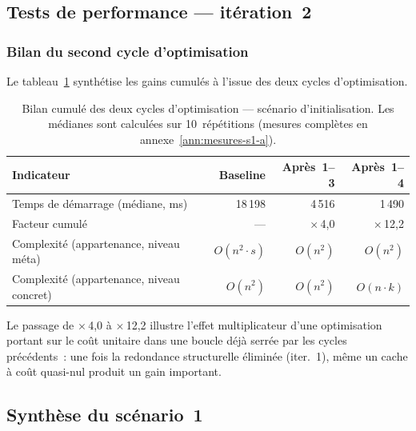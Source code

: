 \subsection{Tests de performance --- itération~2}
\label{sec:scenario1-tests2}

\subsubsection{Bilan du second cycle d'optimisation}

Le tableau~\ref{tab:bilan-opti2} synthétise les gains cumulés à l'issue
des deux cycles d'optimisation.

\begin{table}[h]
\centering
\caption{Bilan cumulé des deux cycles d'optimisation ---
scénario d'initialisation. Les médianes sont calculées sur 10~répétitions
(mesures complètes en annexe~\ref{ann:mesures-s1-a}).}
\label{tab:bilan-opti2}
\begin{tabular}{lrrr}
\hline
\textbf{Indicateur} & \textbf{Baseline} & \textbf{Après~1--3} &
\textbf{Après~1--4} \\
\hline
Temps de démarrage (médiane, ms) & 18\,198 & 4\,516 & 1\,490 \\
Facteur cumulé & --- & $\times$\,4,0 & $\times$\,12,2 \\
Complexité (appartenance, niveau méta) & $O(n^2 \cdot s)$ & $O(n^2)$ & $O(n^2)$ \\
Complexité (appartenance, niveau concret) & $O(n^2)$ & $O(n^2)$ &
$O(n \cdot k)$ \\
\hline
\end{tabular}
\end{table}

Le passage de $\times$\,4,0 à $\times$\,12,2 illustre l'effet
multiplicateur d'une optimisation portant sur le coût unitaire dans une
boucle déjà serrée par les cycles précédents~: une fois la redondance
structurelle éliminée (iter.~1), même un cache à coût quasi-nul produit
un gain important.

\subsection{Synthèse du scénario~1}
\label{sec:scenario1-synthese}

